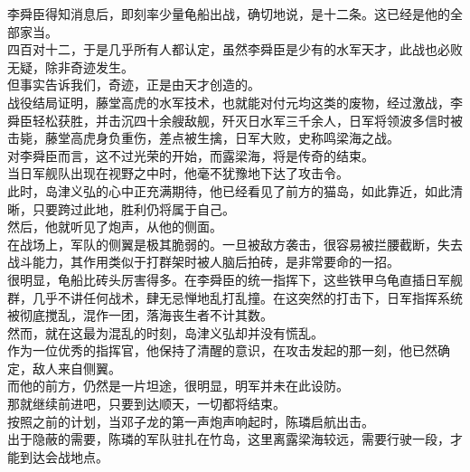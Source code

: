 \begin{multicols}{\theparacolNo}
李舜臣得知消息后，即刻率少量龟船出战，确切地说，是十二条。这已经是他的全部家当。\\

四百对十二，于是几乎所有人都认定，虽然李舜臣是少有的水军天才，此战也必败无疑，除非奇迹发生。\\

但事实告诉我们，奇迹，正是由天才创造的。\\

战役结局证明，藤堂高虎的水军技术，也就能对付元均这类的废物，经过激战，李舜臣轻松获胜，并击沉四十余艘敌舰，歼灭日水军三千余人，日军将领波多信时被击毙，藤堂高虎身负重伤，差点被生擒，日军大败，史称鸣梁海之战。\\

对李舜臣而言，这不过光荣的开始，而露梁海，将是传奇的结束。\\

当日军舰队出现在视野之中时，他毫不犹豫地下达了攻击令。\\

此时，岛津义弘的心中正充满期待，他已经看见了前方的猫岛，如此靠近，如此清晰，只要跨过此地，胜利仍将属于自己。\\

然后，他就听见了炮声，从他的侧面。\\

在战场上，军队的侧翼是极其脆弱的。一旦被敌方袭击，很容易被拦腰截断，失去战斗能力，其作用类似于打群架时被人脑后拍砖，是非常要命的一招。\\

很明显，龟船比砖头厉害得多。在李舜臣的统一指挥下，这些铁甲乌龟直插日军舰群，几乎不讲任何战术，肆无忌惮地乱打乱撞。在这突然的打击下，日军指挥系统被彻底搅乱，混作一团，落海丧生者不计其数。\\

然而，就在这最为混乱的时刻，岛津义弘却并没有慌乱。\\

作为一位优秀的指挥官，他保持了清醒的意识，在攻击发起的那一刻，他已然确定，敌人来自侧翼。\\

而他的前方，仍然是一片坦途，很明显，明军并未在此设防。\\

那就继续前进吧，只要到达顺天，一切都将结束。\\

按照之前的计划，当邓子龙的第一声炮声响起时，陈璘启航出击。\\

出于隐蔽的需要，陈璘的军队驻扎在竹岛，这里离露梁海较远，需要行驶一段，才能到达会战地点。\\


\end{multicols}
